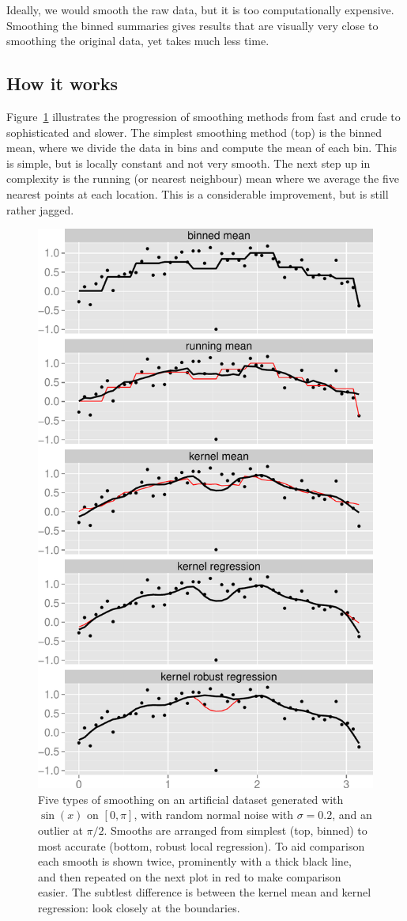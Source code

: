 \documentclass[journal]{vgtc}                %
\begin{document}
Ideally, we would smooth the raw data, but it is too computationally expensive.  Smoothing the binned summaries gives results that are visually very close to smoothing the original data, yet takes much less time.

\subsection{How it works}

Figure~\ref{fig:smooth-types} illustrates the progression of smoothing methods from fast and crude to sophisticated and slower. The simplest smoothing method (top) is the binned mean, where we divide the data in bins and compute the mean of each bin. This is simple, but is locally constant and not very smooth. The next step up in complexity is the running (or nearest neighbour) mean where we average the five nearest points at each location. This is a considerable improvement, but is still rather jagged.

\begin{figure}[htb]
 \centering
 \includegraphics[width=0.75\linewidth]{smooth-types}
 \caption{Five types of smoothing on an artificial dataset generated with $\sin(x)$ on $[0, \pi]$, with random normal noise with $\sigma = 0.2$, and an outlier at $\pi / 2$. Smooths are arranged from simplest (top, binned) to most accurate (bottom, robust local regression). To aid comparison each smooth is shown twice, prominently with a thick black line, and then repeated on the next plot in red to make comparison easier. The subtlest difference is between the kernel mean and kernel regression: look closely at the boundaries.}
 \label{fig:smooth-types}
\end{figure}
\end{document}
